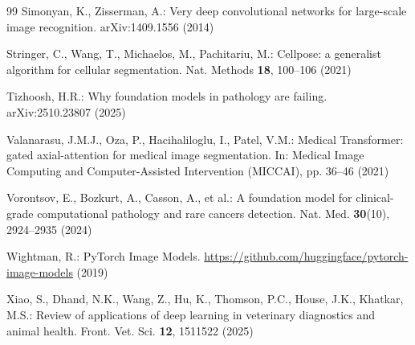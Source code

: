 \documentclass[runningheads]{llncs}
\begin{document}
\begin{thebibliography}{99}
Simonyan, K., Zisserman, A.: Very deep convolutional networks for large-scale image recognition. arXiv:1409.1556 (2014)

Stringer, C., Wang, T., Michaelos, M., Pachitariu, M.: Cellpose: a generalist algorithm for cellular segmentation. Nat. Methods \textbf{18}, 100--106 (2021)

Tizhoosh, H.R.: Why foundation models in pathology are failing. arXiv:2510.23807 (2025)

Valanarasu, J.M.J., Oza, P., Hacihaliloglu, I., Patel, V.M.: Medical Transformer: gated axial-attention for medical image segmentation. In: Medical Image Computing and Computer-Assisted Intervention (MICCAI), pp. 36--46 (2021)

Vorontsov, E., Bozkurt, A., Casson, A., et al.: A foundation model for clinical-grade computational pathology and rare cancers detection. Nat. Med. \textbf{30}(10), 2924--2935 (2024)

Wightman, R.: PyTorch Image Models. \url{https://github.com/huggingface/pytorch-image-models} (2019)

Xiao, S., Dhand, N.K., Wang, Z., Hu, K., Thomson, P.C., House, J.K., Khatkar, M.S.: Review of applications of deep learning in veterinary diagnostics and animal health. Front. Vet. Sci. \textbf{12}, 1511522 (2025)

\end{thebibliography}
\end{document}
